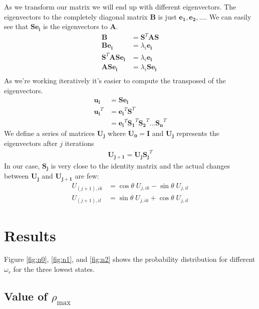 \documentclass[a4paper]{revtex4}
\begin{document}
As we transform our matrix we will end up with different eigenvectors.  The
eigenvectors to the completely diagonal matrix $\mathbf{B}$ is just
$\mathbf{e_1}, \mathbf{e_2}, \dots$. We can easily see that $\mathbf{S}
\mathbf{e_i}$ is the eigenvectors to $\mathbf{A}$.
\begin{align*}
  \mathbf{B} &= \mathbf{S}^T \mathbf{A} \mathbf{S} \\
  \mathbf{B} \mathbf{e_i} &= \lambda_i \mathbf{e_i} \\
  \mathbf{S}^T \mathbf{A} \mathbf{S} \mathbf{e_i} &= \lambda_i \mathbf{e_i} \\
  \mathbf{A} \mathbf{S} \mathbf{e_i} &= \lambda_i \mathbf{S} \mathbf{e_i} \\
\end{align*}
As we're working iteratively it's easier to compute the transposed of the
eigenvectors.
\begin{align*}
  \mathbf{u_i}
  &=  \mathbf{S} \mathbf{e_i} \\
  \mathbf{u_i}^T
  &= \mathbf{e_i}^T \mathbf{S}^T \\
  &= \mathbf{e_i}^T \mathbf{S_1}^T \mathbf{S_2}^T \dots \mathbf{S_n}^T
\end{align*}
We define a series of matrices $\mathbf{U_j}$ where $\mathbf{U_0} =
\mathbf{I}$ and $\mathbf{U_j}$ represents the eigenvectors after $j$
iterations
\begin{align}
  \mathbf{U_{j+1}} = \mathbf{U_j} \mathbf{S_j}^T
\end{align}
In our case, $\mathbf{S_j}$ is very close to the identity matrix and the actual
changes between $\mathbf{U_j}$ and $\mathbf{U_{j+1}}$ are few:
\begin{align}
  U_{(j+1),ik} &=
  \cos\theta\; U_{j,ik}
  - \sin\theta\; U_{j,il}
  \\
  U_{(j+1),il} &=
  \sin\theta\; U_{j,ik}
  + \cos\theta\; U_{j,il}
\end{align}

\section{Results}

Figure \ref{fig:n0}, \ref{fig:n1}, and \ref{fig:n2} shows the probability
distribution for different $\omega_r$ for the three lowest states.

\subsection{Value of $\rho_\text{max}$}
\end{document}
